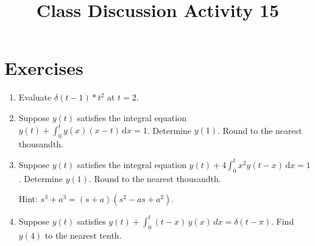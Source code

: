 \documentclass{ximera}
\begin{document}
\begin{abstract}
 \end{abstract}

    \title{Class Discussion Activity 15}
    
    \maketitle

\section*{Exercises}

\begin{enumerate}[label=(\arabic*)]


\item Evaluate $\delta(t-1)\ast t^2$ at $t=2$.  




\item Suppose $y(t)$ satisfies the integral equation $\displaystyle y(t)+\int_0^t y(x)(x-t)\,\mathrm{d}x=1$.  Determine $y(1)$.  Round to the nearest thousandth.










\item Suppose $y(t)$ satisfies the integral equation $\displaystyle y(t)+4\int_0^t  x^2y(t-x)\,\mathrm{d}x=1$.  Determine $y(1)$.  Round to the nearest thousandth.


  Hint:  $s^3+a^3=(s+a)(s^2-as+a^2)$.








\item Suppose $y(t)$ satisfies $\displaystyle y(t)+\int_0^t  (t-x)\,y(x)\,dx=\delta{(t-\pi)}$.  Find $y(4)$ to the nearest tenth.



\end{enumerate}
\end{document}
